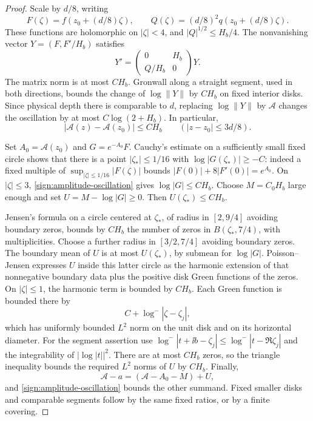 \begin{proof}
Scale by \(d/8\), writing
\[
 F(\zeta)=f(z_0+(d/8)\zeta),\qquad
 Q(\zeta)=(d/8)^2q(z_0+(d/8)\zeta).
\]
These functions are holomorphic on \(|\zeta|<4\), and
\(|Q|^{1/2}\le H_b/4\).  The nonvanishing vector
\(Y=(F,F'/H_b)\) satisfies
\[
 Y'=\begin{pmatrix}0&H_b\\ Q/H_b&0\end{pmatrix}Y.
\]
The matrix norm is at most \(CH_b\).  Gronwall along a straight
segment, used in both directions, bounds the change of
\(\log\|Y\|\) by \(CH_b\) on fixed interior disks.  Since physical
depth there is comparable to \(d\), replacing \(\log\|Y\|\) by
\(\mathcal A\) changes the oscillation by at most
\(C\log(2+H_b)\).  In particular,
\begin{equation}\label{sign:amplitude-oscillation}
 |\mathcal A(z)-\mathcal A(z_0)|\le CH_b
       \qquad (|z-z_0|\le3d/8).
\end{equation}

Set \(A_0=\mathcal A(z_0)\) and \(G=e^{-A_0}F\).
Cauchy's estimate on a sufficiently small fixed circle shows that
there is a point \(|\zeta_*|\le1/16\) with
\(\log|G(\zeta_*)|\ge-C\): indeed a fixed multiple of
\(\sup_{|\zeta|\le1/16}|F(\zeta)|\) bounds
\(|F(0)|+8|F'(0)|=e^{A_0}\).  On \(|\zeta|\le3\),
\eqref{sign:amplitude-oscillation} gives \(\log|G|\le CH_b\).
Choose \(M= C_0H_b\) large enough and set
\(U=M-\log|G|\ge0\).  Then \(U(\zeta_*)\le CH_b\).

Jensen's formula on a circle centered at \(\zeta_*\), of radius in
\([2,9/4]\) avoiding boundary zeros, bounds by \(CH_b\) the number of
zeros in \(B(\zeta_*,7/4)\), with multiplicities.  Choose a further
radius in \([3/2,7/4]\) avoiding boundary zeros.  The boundary mean
of \(U\) is at most \(U(\zeta_*)\), by submean for \(\log|G|\).
Poisson--Jensen expresses \(U\) inside this latter circle as the
harmonic extension of that nonnegative boundary data plus the positive
disk Green functions of the zeros.  On \(|\zeta|\le1\), the harmonic
term is bounded by \(CH_b\).  Each Green function is bounded there by
\[
 C+\log^-|\zeta-\zeta_j|,
\]
which has uniformly bounded \(L^2\) norm on the unit disk and on its
horizontal diameter.  For the segment assertion use
\(\log^-|t+\ii b-\zeta_j|\le\log^-|t-\Re\zeta_j|\) and the
integrability of \(|\log|t||^2\).  There are at most \(CH_b\) zeros,
so the triangle inequality bounds the required \(L^2\) norms of
\(U\) by \(CH_b\).  Finally,
\[
 \mathcal A-a=(\mathcal A-A_0-M)+U,
\]
and \eqref{sign:amplitude-oscillation} bounds the other summand.
Fixed smaller disks and comparable segments follow by the same fixed
ratios, or by a finite covering.
\end{proof}

